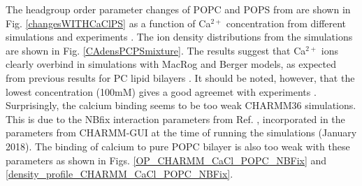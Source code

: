 \documentclass[aps,prl,superscriptaddress,twocolumn]{revtex4}
\begin{document}
The headgroup order parameter changes of POPC and POPS from 
are shown in Fig. \ref{changesWITHCaClPS} as a function of Ca$^{2+}$ concentration from different
simulations and experiments \cite{roux90}. 
The ion density distributions from the simulations are shown in Fig. \ref{CAdensPCPSmixture}.
The results suggest that Ca$^{2+}$ ions clearly overbind in simulations with
MacRog and Berger models, as expected from previous results for PC lipid bilayers \cite{catte16}.
It should be noted, however, that the lowest concentration (100mM) gives
a good agreemet with experiments
.
Surprisingly, the calcium binding seems to be too weak CHARMM36 simulations.
This is due to the NBfix interaction parameters from Ref. , incorporated
in the parameters from CHARMM-GUI at the time of running the simulations (January 2018).
The binding of calcium to pure POPC bilayer is also too weak with these parameters
as shown in Figs. \ref{OP_CHARMM_CaCl_POPC_NBFix} and \ref{density_profile_CHARMM_CaCl_POPC_NBFix}.
\end{document}

